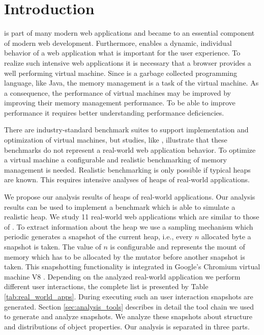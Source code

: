 
\section{Introduction}

\JS is part of many modern web applications and became to an essential
component of modern web development. Furthermore, \JS enables a dynamic,
individual behavior of a web application what is important for the user
experience. To realize such \JS intensive web applications it is necessary that
a browser provides a well performing \JS virtual machine. Since \JS is a
garbage collected programming language, like Java, the memory management is a
task of the virtual machine. As a consequence, the performance of \JS virtual
machines may be improved by improving their memory management performance. To
be able to improve performance it requires better understanding performance
deficiencies.

There are industry-standard benchmark suites to support implementation and
optimization of \JS virtual machines, but studies, like \cite{JSMeter2009},
illustrate that these benchmarks do not represent a real-world web application
behavior. To optimize a \JS virtual machine a configurable and realistic
benchmarking of memory management is needed. Realistic benchmarking is only
possible if typical \JS heaps are known. This requires intensive analyses of
\JS heaps of real-world applications.

We propose our analysis results of \JS heaps of real-world applications. Our
analysis results can be used to implement a benchmark which is able
to simulate a realistic \JS heap. We study 11 real-world web applications
which are similar to those of \cite{JSMeter2009}. To extract information about
the \JS heap we use a sampling mechanism which periodic generates a snapshot
of the current \JS heap, i.e., every $ n $ allocated byte a snapshot is taken. The value
of $ n $ is configurable and represents the mount of memory which has to be
allocated by the mutator before another snapshot is taken. This snapshotting
functionality is integrated in Google's Chromium \cite{Chromium} virtual
machine V8 \cite{V8}. Depending on the analyzed real-world application we
perform different user interactions, the complete list is presented by Table
\ref{tab:real_world_apps}. During executing such an user interaction snapshots
are generated. Section \ref{sec:analysis_tools} describes in detail the tool
chain we used to generate and analyze snapshots. We analyze these snapshots
about structure and distributions of object properties. Our analysis is
separated in three parts.


